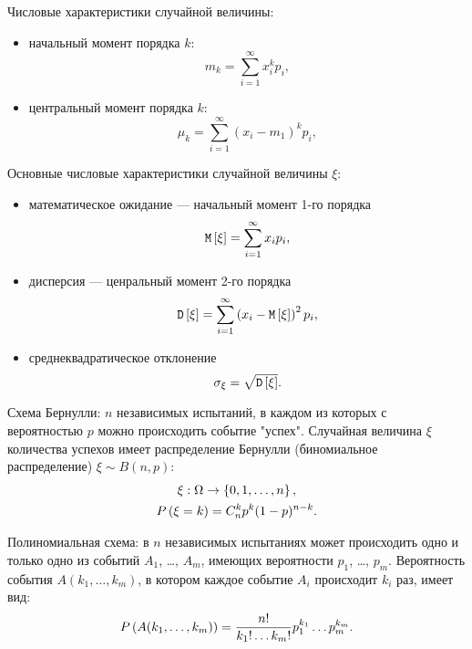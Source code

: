 Числовые характеристики случайной величины:
\begin{itemize}
    \item начальный момент порядка $k$:
    \begin{equation}
        m_k = \sum_{i=1}^{\infty} x_i^k p_i ,
    \end{equation}
    \item центральный момент порядка $k$:
    \begin{equation}
        \mu_k = \sum_{i=1}^{\infty} \left ( x_i - m_1 \right )^k p_i ,
    \end{equation}
\end{itemize}
Основные числовые характеристики случайной величины $\xi$:
\begin{itemize}
    \item математическое ожидание --- начальный момент 1-го порядка
    \begin{equation}
        \mathtt{M} \left [ \xi \right ] = \sum_{i=1}^{\infty} x_i p_i ,
    \end{equation}
    \item дисперсия --- ценральный момент 2-го порядка
    \begin{equation}
        \mathtt{D} \left [ \xi \right ] = \sum_{i=1}^{\infty} \left ( x_i - \mathtt{M} \left [ \xi \right ] \right )^2 p_i ,
    \end{equation}
    \item среднеквадратическое отклонение
    \begin{equation}
        \sigma_\xi = \sqrt{\mathtt{D} \left [ \xi \right ]} .
    \end{equation}
\end{itemize}

Схема Бернулли: $n$ независимых испытаний, в каждом из которых с вероятностью $p$ можно происходить событие "успех"{}.
Случайная величина $\xi$ количества успехов имеет распределение Бернулли (биномиальное распределение) $\xi \sim B(n,p)$:
\begin{gather}
    \xi : \Omega \rightarrow \left \{ 0, 1, \dots, n \right \} \notag, \\
    P \left ( \xi = k \right ) = C_n^k p^k (1-p)^{n-k} .
\end{gather}

Полиномиальная схема: в $n$ независимых испытаниях может происходить одно и только одно из событий $A_1$, \dots, $A_m$, имеющих вероятности $p_1$, \dots, $p_m$.
Вероятность события $A(k_1, \dots, k_m)$, в котором каждое событие $A_i$ происходит $k_i$ раз, имеет вид:
\begin{equation}
    P \left ( A(k_1, \dots, k_m) \right ) = \frac{n!}{k_1! \dots k_m!} p_1^{k_1} \dots p_m^{k_m}.
\end{equation}

